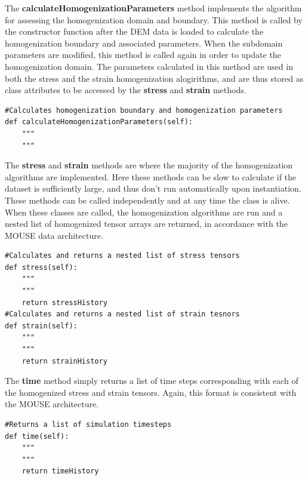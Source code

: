 The \textbf{calculateHomogenizationParameters} method implements the algorithm for assessing the homogenization domain and boundary. This method is called by the constructor function after the DEM data is loaded to calculate the homogenization boundary and associated parameters. When the subdomain parameters are modified, this method is called again in order to update the homogenization domain. The parameters calculated in this method are used in both the stress and the strain homogenization alogirithms, and are thus stored as class attributes to be accessed by the \textbf{stress} and \textbf{strain} methods. 

\begin{lstlisting}[frame=single]                
#Calculates homogenization boundary and homogenization parameters
def calculateHomogenizationParameters(self):
	"""
	"""
\end{lstlisting}

The \textbf{stress} and \textbf{strain} methods are where the majority of the homogenization algorithms are implemented. Here these methods can be slow to calculate if the dataset is sufficiently large, and thus don't run automatically upon instantiation. These methods can be called independently and at any time the class is alive. When these classes are called, the homogenization algorithms are run and a nested list of homogenized tensor arrays are returned, in accordance with the MOUSE data architecture. 
                   
\begin{lstlisting}[frame=single]      
#Calculates and returns a nested list of stress tensors
def stress(self):
	"""
	"""
	return stressHistory
#Calculates and returns a nested list of strain tesnors
def strain(self):
	"""
	"""
	return strainHistory
\end{lstlisting}

The \textbf{time} method simply returns a list of time steps corresponding with each of the homogenized stress and strain tensors. Again, this format is consistent with the MOUSE architecture.

\begin{lstlisting}[frame=single]      
#Returns a list of simulation timesteps
def time(self):
	"""
	"""
	return timeHistory
\end{lstlisting}
